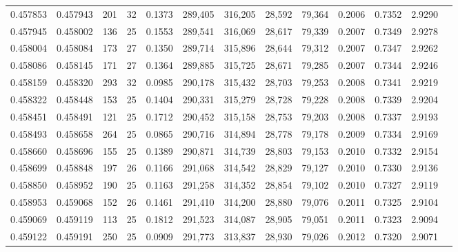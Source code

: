 \begin{tabular}{rrrrrrrrrrrrr}
0.457853 & 0.457943 & 201 &  32 &                                     0.1373 & 289,405 & 316,205 &  28,592 &  79,364 & 0.2006 & 0.7352 & 2.9290 \\
0.457945 & 0.458002 & 136 &  25 &                                     0.1553 & 289,541 & 316,069 &  28,617 &  79,339 & 0.2007 & 0.7349 & 2.9278 \\
0.458004 & 0.458084 & 173 &  27 &                                     0.1350 & 289,714 & 315,896 &  28,644 &  79,312 & 0.2007 & 0.7347 & 2.9262 \\
0.458086 & 0.458145 & 171 &  27 &                                     0.1364 & 289,885 & 315,725 &  28,671 &  79,285 & 0.2007 & 0.7344 & 2.9246 \\
0.458159 & 0.458320 & 293 &  32 &                                     0.0985 & 290,178 & 315,432 &  28,703 &  79,253 & 0.2008 & 0.7341 & 2.9219 \\
0.458322 & 0.458448 & 153 &  25 &                                     0.1404 & 290,331 & 315,279 &  28,728 &  79,228 & 0.2008 & 0.7339 & 2.9204 \\
0.458451 & 0.458491 & 121 &  25 &                                     0.1712 & 290,452 & 315,158 &  28,753 &  79,203 & 0.2008 & 0.7337 & 2.9193 \\
0.458493 & 0.458658 & 264 &  25 &                                     0.0865 & 290,716 & 314,894 &  28,778 &  79,178 & 0.2009 & 0.7334 & 2.9169 \\
0.458660 & 0.458696 & 155 &  25 &                                     0.1389 & 290,871 & 314,739 &  28,803 &  79,153 & 0.2010 & 0.7332 & 2.9154 \\
0.458699 & 0.458848 & 197 &  26 &                                     0.1166 & 291,068 & 314,542 &  28,829 &  79,127 & 0.2010 & 0.7330 & 2.9136 \\
0.458850 & 0.458952 & 190 &  25 &                                     0.1163 & 291,258 & 314,352 &  28,854 &  79,102 & 0.2010 & 0.7327 & 2.9119 \\
0.458953 & 0.459068 & 152 &  26 &                                     0.1461 & 291,410 & 314,200 &  28,880 &  79,076 & 0.2011 & 0.7325 & 2.9104 \\
0.459069 & 0.459119 & 113 &  25 &                                     0.1812 & 291,523 & 314,087 &  28,905 &  79,051 & 0.2011 & 0.7323 & 2.9094 \\
0.459122 & 0.459191 & 250 &  25 &                                     0.0909 & 291,773 & 313,837 &  28,930 &  79,026 & 0.2012 & 0.7320 & 2.9071 \\

\end{tabular}
